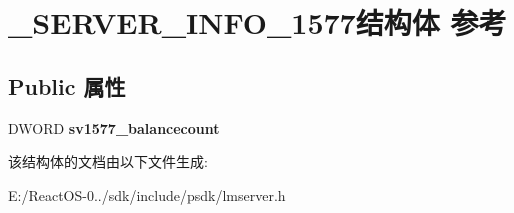 \hypertarget{struct___s_e_r_v_e_r___i_n_f_o__1577}{}\section{\+\_\+\+S\+E\+R\+V\+E\+R\+\_\+\+I\+N\+F\+O\+\_\+1577结构体 参考}
\label{struct___s_e_r_v_e_r___i_n_f_o__1577}
\subsection*{Public 属性}
\begin{DoxyCompactItemize}
\item 
\mbox{\label{struct___s_e_r_v_e_r___i_n_f_o__1577_a2c591a398f33fd0988c9b9742476581d}} 
D\+W\+O\+RD {\bfseries sv1577\+\_\+balancecount}
\end{DoxyCompactItemize}


该结构体的文档由以下文件生成\+:\begin{DoxyCompactItemize}
\item 
E\+:/\+React\+O\+S-\/0../sdk/include/psdk/lmserver.\+h\end{DoxyCompactItemize}
